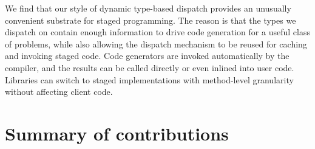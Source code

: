 We find that our style of dynamic type-based dispatch provides
an unusually convenient substrate for staged programming.
The reason is that the types we dispatch on contain enough
information to drive code generation for a useful class of problems,
while also allowing
the dispatch mechanism to be reused for caching and invoking staged code.
Code generators are invoked automatically by
the compiler, and the results can be called directly or even inlined
into user code.
Libraries can switch to staged implementations with method-level granularity
without affecting client code.




\section{Summary of contributions}

\iffalse
We began with a belief that we could design a technical computing language
sufficiently novel and powerful that it could gain popularity
in real applications.
The key idea was that language level abstractions could bring ease of use,
performance, and wider applicability to technical computation.
It is far from trivial to analyze and design this right set of abstractions
This thesis contributes a deep analysis of our findings.  

At the very core, the novel idea in this
thesis is the very notion that technical computing is amenable to deep language
analysis.
As simple as this may sound, many in the technical computing world did not
understand how a computer science approach to technical computing could be
useful to them.
Our personal experience describing the research plan to
the computer science world might be
characterized by the view that this space consists of library
functions such as FFTs and matmuls and would not be as interesting
to analyze.
Despite the early discouraging viewpoints, five years later,
the power of language analysis is manifesting itself
theoretically, opening new research directions, and practically in that Julia
has worldwide name recognition and worldwide adaption.
\fi

